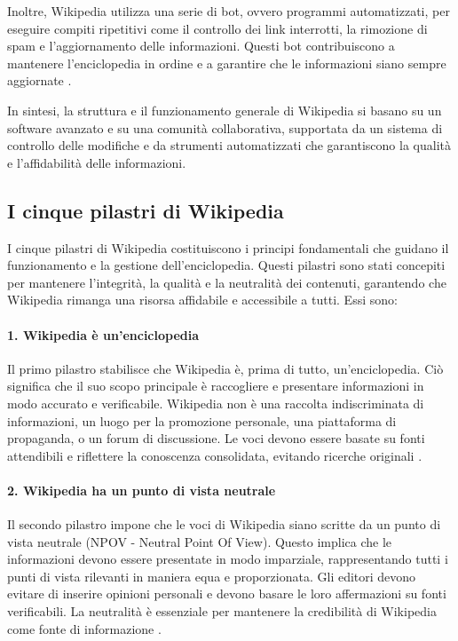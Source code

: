 \documentclass[12pt,a4paper]{report}
\begin{document}
Inoltre, Wikipedia utilizza una serie di bot, ovvero programmi automatizzati, per eseguire compiti ripetitivi come il controllo dei link interrotti, la rimozione di spam e l'aggiornamento delle informazioni. Questi bot contribuiscono a mantenere l'enciclopedia in ordine e a garantire che le informazioni siano sempre aggiornate \cite{history_of_wikis}.

In sintesi, la struttura e il funzionamento generale di Wikipedia si basano su un software avanzato e su una comunità collaborativa, supportata da un sistema di controllo delle modifiche e da strumenti automatizzati che garantiscono la qualità e l'affidabilità delle informazioni.

\subsection{I cinque pilastri di Wikipedia}

I cinque pilastri di Wikipedia costituiscono i principi fondamentali che guidano il funzionamento e la gestione dell'enciclopedia. Questi pilastri sono stati concepiti per mantenere l'integrità, la qualità e la neutralità dei contenuti, garantendo che Wikipedia rimanga una risorsa affidabile e accessibile a tutti. Essi sono:

\paragraph*{1. Wikipedia è un'enciclopedia}
Il primo pilastro stabilisce che Wikipedia è, prima di tutto, un'enciclopedia. Ciò significa che il suo scopo principale è raccogliere e presentare informazioni in modo accurato e verificabile. Wikipedia non è una raccolta indiscriminata di informazioni, un luogo per la promozione personale, una piattaforma di propaganda, o un forum di discussione. Le voci devono essere basate su fonti attendibili e riflettere la conoscenza consolidata, evitando ricerche originali \cite{reagle2010good}.

\paragraph*{2. Wikipedia ha un punto di vista neutrale}
Il secondo pilastro impone che le voci di Wikipedia siano scritte da un punto di vista neutrale (NPOV - Neutral Point Of View). Questo implica che le informazioni devono essere presentate in modo imparziale, rappresentando tutti i punti di vista rilevanti in maniera equa e proporzionata. Gli editori devono evitare di inserire opinioni personali e devono basare le loro affermazioni su fonti verificabili. La neutralità è essenziale per mantenere la credibilità di Wikipedia come fonte di informazione \cite{denning2005wikipedia}.
\end{document}
